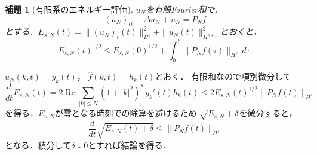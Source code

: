\documentclass[a5paper,10pt,onecolumn]{jsarticle}
\makeatletter
\theoremstyle{mathnotetheorem}
\newtheorem{lemma}[theorem]{補題}
\renewcommand{\proofname}{証明}
\renewenvironment{proof}[1][\proofname]{%
  \par\pushQED{\qed}\normalfont\topsep4\p@\@plus2\p@\relax
  \trivlist\item[\hskip\labelsep\bfseries #1]\ignorespaces
}{\popQED\endtrivlist\@endpefalse}
\makeatother
\begin{document}
\begin{lemma}[有限系のエネルギー評価]\label{wave:lem:energy}
$u_N$を有限Fourier和で，
\[
 (u_N)_{tt}-\Delta u_N+u_N=P_Nf
\]
とする．$E_{s,N}(t)=\|(u_N)_t(t)\|_{H^s}^2+
\|u_N(t)\|_{H^{s+1}}^2$とおくと，
\[
 E_{s,N}(t)^{1/2}\le
 E_{s,N}(0)^{1/2}+\int_0^t\|P_Nf(\tau)\|_{H^s}\,d\tau.
\]
\end{lemma}
\begin{proof}
$\widehat u_N(k,t)=y_k(t)$，
$\widehat f(k,t)=h_k(t)$とおく．
有限和なので項別微分して
\[
 \frac d{dt} E_{s,N}(t)
 =2\operatorname{Re}\sum_{|k|\le N}
 (1+|k|^2)^s\,\overline{y_k'(t)}h_k(t)
 \le2 E_{s,N}(t)^{1/2}\|P_N f(t)\|_{H^s}
\]
を得る．$E_{s,N}$が零となる時刻での除算を避けるため
$\sqrt{E_{s,N}+\delta}$を微分すると，
\[
 \frac d{dt}\sqrt{E_{s,N}(t)+\delta}
 \le\|P_N f(t)\|_{H^s}
\]
となる．積分して$\delta\downarrow0$とすれば結論を得る．
\end{proof}
\end{document}
